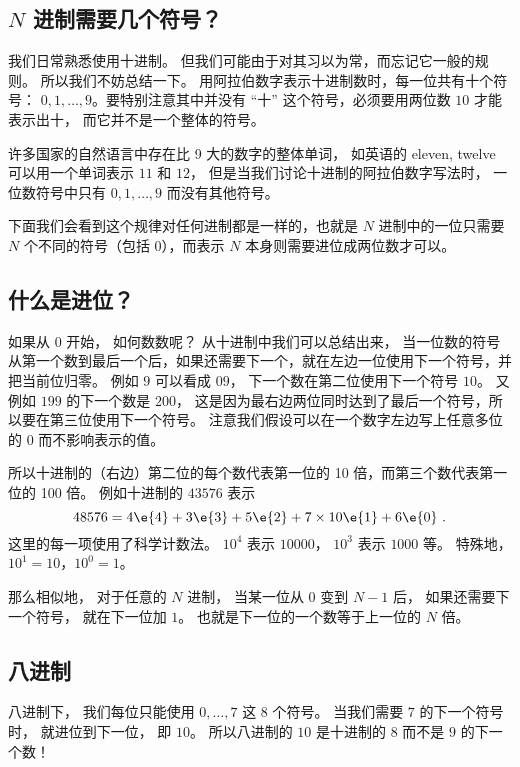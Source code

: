 
\begin{issues}
\issueDraft
\end{issues}

\subsection{$N$ 进制需要几个符号？}
我们日常熟悉使用十进制。 但我们可能由于对其习以为常，而忘记它一般的规则。 所以我们不妨总结一下。 用阿拉伯数字表示十进制数时，每一位共有十个符号： $0,1,\dots, 9$。要特别注意其中并没有 “十” 这个符号，必须要用两位数 $10$ 才能表示出十， 而它并不是一个整体的符号。

许多国家的自然语言中存在比 9 大的数字的整体单词， 如英语的 eleven, twelve 可以用一个单词表示 $11$ 和 $12$， 但是当我们讨论十进制的阿拉伯数字写法时， 一位数符号中只有 $0,1,\dots, 9$ 而没有其他符号。 

下面我们会看到这个规律对任何进制都是一样的，也就是 $N$ 进制中的一位只需要 $N$ 个不同的符号（包括 0），而表示 $N$ 本身则需要进位成两位数才可以。

\subsection{什么是进位？}
如果从 $0$ 开始， 如何数数呢？ 从十进制中我们可以总结出来， 当一位数的符号从第一个数到最后一个后，如果还需要下一个，就在左边一位使用下一个符号，并把当前位归零。 例如 $9$ 可以看成 $09$， 下一个数在第二位使用下一个符号 $10$。 又例如 $199$ 的下一个数是 $200$， 这是因为最右边两位同时达到了最后一个符号，所以要在第三位使用下一个符号。 注意我们假设可以在一个数字左边写上任意多位的 $0$ 而不影响表示的值。

所以十进制的（右边）第二位的每个数代表第一位的 10 倍，而第三个数代表第一位的 100 倍。 例如十进制的 $43576$ 表示
\begin{equation}\label{eq_Binary_1}
48576 = 4\e{4} + 3\e{3} + 5\e{2} + 7\times 10\e{1} + 6\e{0}~.
\end{equation}
这里的每一项使用了科学计数法。%
$10^4$ 表示 $10000$， $10^3$ 表示 $1000$ 等。 特殊地， $10^1=10$，$10^0=1$。

那么相似地， 对于任意的 $N$ 进制， 当某一位从 $0$ 变到 $N-1$ 后， 如果还需要下一个符号， 就在下一位加 $1$。 也就是下一位的一个数等于上一位的 $N$ 倍。

\subsection{八进制}
八进制下， 我们每位只能使用 $0,\dots,7$ 这 $8$ 个符号。 当我们需要 $7$ 的下一个符号时， 就进位到下一位， 即 $10$。 所以八进制的 $10$ 是十进制的 $8$ 而不是 $9$ 的下一个数！

